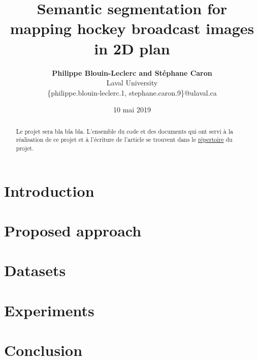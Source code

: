 \documentclass[10pt,letterpaper]{article}
\title{{\huge \bf Semantic segmentation for mapping hockey broadcast images in 2D plan}}
\author{{\bf Philippe Blouin-Leclerc and Stéphane Caron} \\ {Laval University} \\
{\{philippe.blouin-leclerc.1, stephane.caron.9\}}@ulaval.ca}
\date{10 mai 2019}
\numberwithin{equation}{section}
\begin{document}
\maketitle

\begin{multicols}{2}

\begin{abstract}
Le projet sera bla bla bla. L'ensemble du code et des documents qui ont servi à la réalisation de ce projet et à l'écriture de l'article se trouvent dans le \href{https://github.com/stecaron/glo-7030-projet}{répertoire} du projet.
\end{abstract}


\section{Introduction}




\section{Proposed approach}




\section{Datasets}




\section{Experiments}




\section{Conclusion}




\nocite{hastie01statisticallearning}



\setlength{\bibleftmargin}{.125in}
\setlength{\bibindent}{-\bibleftmargin}



\end{multicols}
\end{document}
